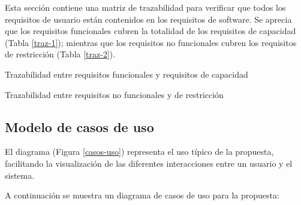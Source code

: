 Esta sección contiene una matriz de trazabilidad para verificar que todos los requisitos de usuario están contenidos en los requisitos de software. Se aprecia que los requisitos funcionales cubren la totalidad de los requisitos de capacidad (Tabla \ref{traz-1}); mientras que los requisitos no funcionales cubren los requisitos de restricción (Tabla \ref{traz-2}).

\begin{table}[H]
    \traceabilityFNCA
    \caption{Trazabilidad entre requisitos funcionales y requisitos de capacidad}
    \label{traz-1}
\end{table}

\begin{table}[H]
    \traceabilityNFRE
    \caption{Trazabilidad entre requisitos no funcionales y de restricción}
    \label{traz-2}
\end{table}

\subsection{Modelo de casos de uso}\label{subsec:use-cases}

El diagrama (Figura \ref{casos-uso}) representa el uso típico de la propuesta, facilitando la visualización de las diferentes interacciones entre un usuario y el sistema. 

\printuctemplate{}

A continuación se muestra un diagrama de casos de uso para la propuesta:

